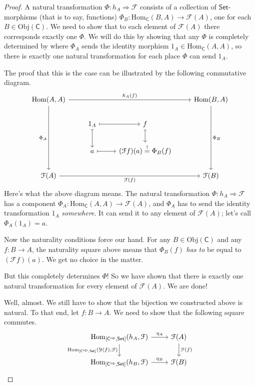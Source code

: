 \documentclass[a4paper,10pt]{scrreprt}
\newcommand{\Obj}{\mathrm{Obj}}
\newcommand{\Hom}{\mathrm{Hom}}
\theoremstyle{definition}
\theoremstyle{plain}
\theoremstyle{remark}
\begin{document}
\begin{proof}
  A natural transformation $\Phi\colon h_{A} \Rightarrow \mathcal{F}$ consists of a collection of $\mathsf{Set}$-morphisms (that is to say, functions) $\Phi_{B}\colon \Hom_{\mathsf{C}}(B, A) \to \mathcal{F}(A)$, one for each $B \in \Obj(\mathsf{C})$. We need to show that to each element of $\mathcal{F}(A)$ there corresponds exactly one $\Phi$. We will do this by showing that any $\Phi$ is completely determined by where $\Phi_{A}$ sends the identity morphism $1_{A} \in \Hom_{\mathsf{C}}(A, A)$, so there is exactly one natural transformation for each place $\Phi$ can send $1_{A}$.

  The proof that this is the case can be illustrated by the following commutative diagram.
  \begin{equation*}
    \begin{tikzcd}
      \Hom(A, A)
      \arrow[rrr, "h_{A}(f)"]
      \arrow[ddd, swap, "\Phi_{A}"]
      & & & \Hom(B, A)
      \arrow[ddd, "\Phi_{B}"]
      \\
      & 1_{A}
      \arrow[r, mapsto]
      \arrow[d, mapsto]
      & f
      \arrow[d, mapsto]
      \\
      & a
      \arrow[r, mapsto]
      & (\mathcal{F}f)(a) \stackrel{!}{=} \Phi_{B}(f) 
      \\
      \mathcal{F}(A)
      \arrow[rrr, swap, "\mathcal{F}(f)"]
      & & & \mathcal{F}(B)
    \end{tikzcd}
  \end{equation*}
  Here's what the above diagram means. The natural transformation $\Phi\colon h_{A} \Rightarrow \mathcal{F}$ has a component $\Phi_{A}\colon \Hom_{\mathsf{C}}(A, A) \to \mathcal{F}(A)$, and $\Phi_{A}$ has to send the identity transformation $1_{A}$ \emph{somewhere}. It can send it to any element of $\mathcal{F}(A)$; let's call $\Phi_{A}(1_{A}) = a$.

  Now the naturality conditions force our hand. For any $B \in \Obj(\mathsf{C})$ and any $f\colon B \to A$, the naturality square above means that $\Phi_{B}(f)$ \emph{has to} be equal to $(\mathcal{F}f)(a)$. We get no choice in the matter.

  But this completely determines $\Phi$! So we have shown that there is exactly one natural transformation for every element of $\mathcal{F}(A)$. We are done!

  Well, almost. We still have to show that the bijection we constructed above is natural. To that end, let $f\colon B \to A$. We need to show that the following square commutes.
  \begin{equation*}
    \begin{tikzcd}
      \Hom_{[\mathsf{C}^{\text{op}}, \mathsf{Set}]}(h_{A}, \mathcal{F})
      \arrow[r, "\eta_{A}"]
      \arrow[d, swap, "{\Hom_{[\mathsf{C}^{\text{op}}, \mathsf{Set}]}(\mathcal{Y}(f), \mathcal{F})}"]
      & \mathcal{F}(A)
      \arrow[d, "\mathcal{F}(f)"]
      \\
      \Hom_{[\mathsf{C}^{\text{op}}, \mathsf{Set}]}(h_{B}, \mathcal{F})
      \arrow[r, "\eta_{B}"]
      & \mathcal{F}(B)
    \end{tikzcd}
  \end{equation*}


\end{proof}
\end{document}
